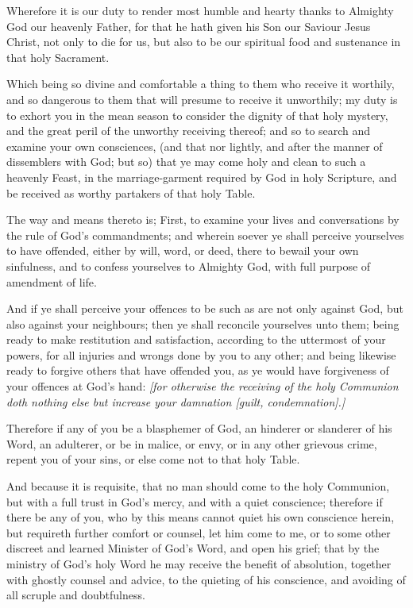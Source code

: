 Wherefore it is our duty to render most humble and hearty thanks to Almighty God our heavenly Father, for that he hath given his Son our Saviour Jesus Christ, not only to die for us, but also to be our spiritual food and sustenance in that holy Sacrament.

Which being so divine and comfortable a thing to them who receive it worthily, and so dangerous to them that will presume to receive it unworthily; my duty is to exhort you in the mean season to consider the dignity of that holy mystery, and the great peril of the unworthy receiving thereof; and so to search and examine your own consciences, (and that nor lightly, and after the manner of dissemblers with God; but so) that ye may come holy and clean to such a heavenly Feast, in the marriage-garment required by God in holy Scripture, and be received as worthy partakers of that holy Table.

The way and means thereto is; First, to examine your lives and conversations by the rule of God’s commandments; and wherein soever ye shall perceive yourselves to have offended, either by will, word, or deed, there to bewail your own sinfulness, and to confess yourselves to Almighty God, with full purpose of amendment of life. 

And if ye shall perceive your offences to be such as are not only against God, but also against your neighbours; then ye shall reconcile yourselves unto them; being ready to make restitution and satisfaction, according to the uttermost of your powers, for all injuries and wrongs done by you to any other; and being likewise ready to forgive others that have offended you, as ye would have forgiveness of your offences at God’s hand: \emph{[for otherwise the receiving of the holy Communion doth nothing else but increase your \emph{damnation} [guilt, condemnation].]}

Therefore if any of you be a blasphemer of God, an hinderer or slanderer of his Word, an adulterer, or be in malice, or envy, or in any other grievous crime, repent you of your sins, or else come not to that holy Table.

And because it is requisite, that no man should come to the holy Communion, but with a full trust in God's mercy, and with a quiet conscience; therefore if there be any of you, who by this means cannot quiet his own conscience herein, but requireth further comfort or counsel, let him come to me, or to some other discreet and learned Minister of God's Word, and open his grief; that by the ministry of God's holy Word he may receive the benefit of absolution, together with ghostly counsel and advice, to the quieting of his conscience, and avoiding of all scruple and doubtfulness.


